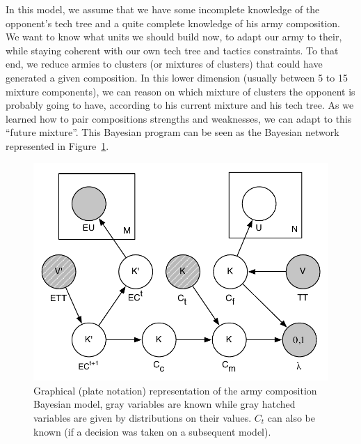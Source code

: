 In this model, we assume that we have some incomplete knowledge of the opponent's tech tree and a quite complete knowledge of his army composition. We want to know what units we should build now, to adapt our army to their, while staying coherent with our own tech tree and tactics constraints. To that end, we reduce armies to clusters (or mixtures of clusters) that could have generated a given composition. In this lower dimension (usually between 5 to 15 mixture components), %
we can reason on which mixture of clusters the opponent is probably going to have, according to his current mixture and his tech tree. As we learned how to pair compositions strengths and weaknesses, we can adapt to this ``future mixture''. This Bayesian program can be seen as the Bayesian network represented in Figure~\ref{BN}. %

\begin{figure}[htp]
\centerline{\includegraphics[width=0.55\columnwidth]{images/army_composition_model.pdf}}
\caption{Graphical (plate notation) representation of the army composition Bayesian model, gray variables are known while gray hatched variables are given by distributions on their values. $C_t$ can also be known (if a decision was taken on a subsequent model).}
\label{BN}
\vspace{-0.5cm}
\end{figure}

